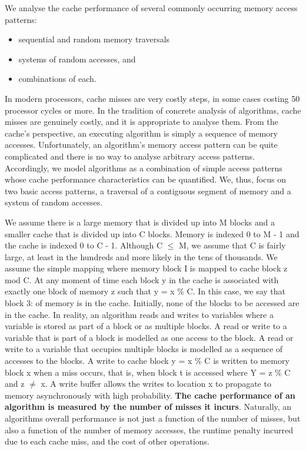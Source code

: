 \documentclass[14pt]{article}
\begin{document}
We analyse the cache performance of several commonly occurring memory access patterns: 

\begin{itemize}
	\item sequential and random memory traversals
	\item systems of random accesses, and
	\item combinations of each.
\end{itemize}


In modern processors, cache misses are very costly steps, in some cases costing 50 processor cycles or more. In the tradition of concrete analysis of algorithms, cache misses are genuinely costly, and it is appropriate to analyse them. 
From the cache's perspective, an executing algorithm is simply a sequence of memory accesses. Unfortunately, an algorithm's memory access pattern can be quite complicated and there is no way to analyse arbitrary access patterns. Accordingly, we model algorithms as a combination of simple access patterns whose cache performance characteristics can be quantified. We, thus, focus on two basic access patterns, a traversal of a contiguous segment of memory and a system of random accesses.  

We assume there is a large memory that is divided up into M blocks and a smaller cache that is divided up into C blocks. Memory is indexed 0 to M - 1 and the cache is indexed 0 to C - 1. Although C $\leq$ M, we assume that C is fairly large, at least in the hundreds and more likely in the tens of thousands.  We assume the simple mapping where memory block I is mapped to cache block z mod C. At any moment of time each block y in the cache is associated with exactly one block of memory z such that y = x \% C. In this case, we say that block 3: of memory is in the cache. 
Initially, none of the blocks to be accessed are in the cache. In reality, an algorithm reads and writes to variables where a variable is stored as part of a block or as multiple blocks. A read or write to a variable that is part of a block is modelled as one access to the block. A read or write to a variable that occupies multiple blocks is modelled as a sequence of accesses to the blocks. A write to cache block y = x \% C is written to memory block x when a miss occurs, that is, when block t is accessed where Y = z \% C and z $\neq$ x. A write buffer allows the writes to location x to propagate to memory asynchronously with high probability. \textbf{The cache performance of an algorithm is measured by the number of misses it incurs}. Naturally, an algorithms overall performance is not just a function of the number of misses, but also a function of the number of memory accesses, the runtime penalty incurred due to each cache miss, and the cost of other operations. \\
\end{document}
